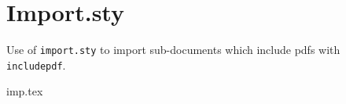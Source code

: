 \documentclass[a4paper,\myClassOptions]{article}
\begin{document}
\section{Import.sty}
Use of \texttt{import.sty} to import sub-documents which include
pdfs with \texttt{includepdf}.


\begingroup
{imp.tex}
\endgroup
\end{document}
